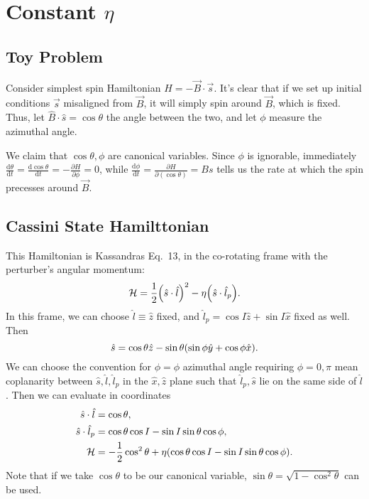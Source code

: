\documentclass[11pt,
        usenames, %
        dvipsnames %
    ]{article}
\newcommand*{\rd}[2]{\frac{\mathrm{d}#1}{\mathrm{d}#2}}
\newcommand*{\pd}[2]{\frac{\partial#1}{\partial#2}}
\DeclarePairedDelimiter\p{\lparen}{\rparen}
\begin{document}
\def\Snospace~{\S{}} %
\renewcommand*{\sectionautorefname}{\Snospace}
\renewcommand*{\appendixautorefname}{\Snospace}
\renewcommand*{\figureautorefname}{Fig.}
\renewcommand*{\equationautorefname}{Eq.}
\renewcommand*{\tableautorefname}{Tab.}

\section{Constant $\eta$}

\subsection{Toy Problem}

Consider simplest spin Hamiltonian $H = -\vec{B} \cdot \vec{s}$. It's clear that
if we set up initial conditions $\vec{s}$ misaligned from $\vec{B}$, it will
simply spin around $\vec{B}$, which is fixed. Thus, let $\hat{B} \cdot \hat{s} =
\cos \theta$ the angle between the two, and let $\phi$ measure the azimuthal
angle.

We claim that $\cos \theta, \phi$ are canonical variables. Since $\phi$ is
ignorable, immediately $\rd{\theta}{t} = \rd{\cos \theta}{t} = -\pd{H}{\phi} =
0$, while $\rd{\phi}{t} = \pd{H}{(\cos \theta)} = Bs$ tells us the rate at which
the spin precesses around $\vec{B}$.

\subsection{Cassini State Hamilttonian}

This Hamiltonian is Kassandras Eq.\ 13, in the co-rotating frame with the
perturber's angular momentum:
\begin{equation}
    \mathcal{H} = \frac{1}{2}\p*{\hat{s} \cdot \hat{l}}^2
        - \eta \p*{\hat{s} \cdot \hat{l}_p}.
\end{equation}
In this frame, we can choose $\hat{l} \equiv \hat{z}$ fixed, and $\hat{l}_p =
\cos I\hat{z} + \sin I\hat{x}$ fixed as well. Then
\begin{equation*}
    \hat{s} = \cos\theta \hat{z}
        - \sin\theta\p*{\sin \phi \hat{y} + \cos \phi \hat{x}}.
\end{equation*}
We can choose the convention for $\phi = \phi$ azimuthal angle requiring $\phi =
0, \pi$ mean coplanarity between $\hat{s}, \hat{l}, \hat{l}_p$ in the $\hat{x},
\hat{z}$ plane such that $\hat{l}_p, \hat{s}$ lie on the same side of
$\hat{l}$. Then we can evaluate in coordinates
\begin{align*}
    \hat{s} \cdot \hat{l} &= \cos \theta,\\
    \hat{s} \cdot \hat{l}_p
        &= \cos \theta \cos I - \sin I \sin \theta \cos \phi,\\
    \mathcal{H} &= -\frac{1}{2}\cos^2\theta
        + \eta \p*{\cos \theta \cos I - \sin I \sin \theta \cos \phi}.
\end{align*}
Note that if we take $\cos\theta$ to be our canonical variable, $\sin\theta =
\sqrt{1 - \cos^2\theta}$ can be used.
\end{document}
